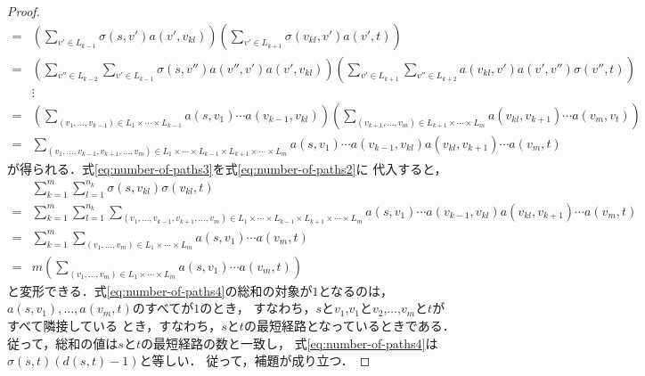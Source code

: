 \begin{proof}
\begin{align}
    =&\left(\sum_{v'\in L_{k-1}}\sigma(s,v')a(v',v_{kl})\right)
    \left(\sum_{v'\in L_{k+1}}\sigma(v_{kl},v')a(v',t)\right)
    \nonumber\\
    =&\left(\sum_{v''\in L_{k-2}}\sum_{v'\in L_{k-1}}
    \sigma(s,v'')a(v'',v')a(v',v_{kl})\right)
    \left(\sum_{v'\in L_{k+1}}\sum_{v''\in L_{k+2}}
    a(v_{kl},v')a(v',v'')\sigma(v'',t)\right)
    \nonumber\\
    &\vdots\nonumber\\
    =&\left(\sum_{(v_1,\ldots,v_{k-1})\in L_1\times\cdots\times L_{k-1}}
    a(s,v_1)\cdots a(v_{k-1},v_{kl})\right)
    \left(\sum_{(v_{k+1},\ldots,v_m)\in L_{k+1}\times\cdots\times L_m}
    a(v_{kl},v_{k+1})\cdots a(v_m,v_t)\right)\nonumber\\
    =&\sum_{
      (v_1,\ldots,v_{k-1},v_{k+1},\ldots,v_m)\in
      L_1\times\cdots\times L_{k-1}\times L_{k+1}\times\cdots\times L_m
    }
    a(s,v_1)\cdots a(v_{k-1},v_{kl})a(v_{kl},v_{k+1})\cdots a(v_m,t)
    \label{eq:number-of-paths3}
  \end{align}
  が得られる．式\ref{eq:number-of-paths3}を式\ref{eq:number-of-paths2}に
  代入すると，
  \begin{align}
    &\sum_{k=1}^m\sum_{l=1}^{n_k}\sigma(s,v_{kl})\sigma(v_{kl},t)\nonumber\\
    =&\sum_{k=1}^m\sum_{l=1}^{n_k}\sum_{
      (v_1,\ldots,v_{k-1},v_{k+1},\ldots,v_m)\in
      L_1\times\cdots\times L_{k-1}\times L_{k+1}\times\cdots\times L_m
    }
    a(s,v_1)\cdots a(v_{k-1},v_{kl})a(v_{kl},v_{k+1})\cdots a(v_m,t)\nonumber\\
    =&\sum_{k=1}^m\sum_{(v_1,\ldots,v_m)\in L_1\times\cdots\times L_m}
    a(s,v_1)\cdots a(v_m,t)\nonumber\\
    =&m\left(\sum_{(v_1,\ldots,v_m)\in L_1\times\cdots\times L_m}
    a(s,v_1)\cdots a(v_m,t)\right)
    \label{eq:number-of-paths4}
  \end{align}
  と変形できる．式\ref{eq:number-of-paths4}の総和の対象が$1$となるのは，
  $a(s,v_1),\ldots,a(v_m,t)$のすべてが$1$のとき，
  すなわち，$s$と$v_1$,$v_1$と$v_2$,$\ldots$,$v_m$と$t$がすべて隣接している
  とき，すなわち，$s$と$t$の最短経路となっているときである．
  従って，総和の値は$s$と$t$の最短経路の数と一致し，
  式\ref{eq:number-of-paths4}は$\sigma(s,t)(d(s,t)-1)$と等しい．
  従って，補題が成り立つ．
\end{proof}

